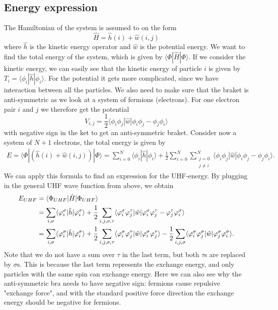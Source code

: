 \documentclass[norsk,a4paper,12pt]{article}
\begin{document}
\subsection{Energy expression}
The Hamiltonian of the system is assumed to on the form
\begin{equation}
\hat{H}=\hat{h}(i) + \hat{w}(i,j)
\end{equation}
where $\hat{h}$ is the kinetic energy operator and $\hat{w}$ is the potential energy. We want to find the total energy of the system, which is given by $\langle \Phi|\hat{H}|\Phi\rangle$. If we consider the kinetic energy, we can easily see that the kinetic energy of particle $i$ is given by $T_i=\langle\phi_i|\hat{h}|\phi_i\rangle$. For the potential it gets more complicated, since we have interaction between all the particles. We also need to make sure that the braket is anti-symmetric as we look at a system of fermions (electrons). For one electron pair $i$ and $j$ we therefore get the potential 
\begin{equation*}
V_{i,j}=\frac{1}{2}\langle\phi_i\phi_j|\hat{w}|\phi_i\phi_j-\phi_j\phi_i\rangle
\end{equation*}
with negative sign in the ket to get an anti-symmetric braket. Consider now a system of $N+1$ electrons, the total energy is given by
\begin{equation*}
\begin{split}
E=\langle\Phi|(\hat{h}(i) + \hat{w}(i,j))|\Phi\rangle
=\sum_{i=0}^N\langle\phi_i|\hat{h}|\phi_i\rangle+\frac{1}{2}\sum_{i=0}^N\sum_{\substack{j=0\\j\neq i}}^N\langle\phi_i\phi_j|\hat{w}|\phi_i\phi_j-\phi_j\phi_i\rangle.
\end{split}
\end{equation*}
We can apply this formula to find an expression for the UHF-energy. By plugging in the general UHF wave function from above, we obtain
\begin{align}
E_{UHF}&=\langle \Phi_{UHF}|\hat{H}|\Phi_{UHF}\rangle\notag\\
&=\sum_{i,\sigma}\langle\varphi_i^{\sigma}|\hat{h}|\varphi_i^{\sigma}\rangle+\frac{1}{2}\sum_{i,j,\sigma,\tau}\langle\varphi_i^{\sigma}\varphi_j^{\tau}|\hat{w}|\varphi_i^{\sigma}\varphi_j^{\tau}-\varphi_j^{\tau}\varphi_i^{\sigma}\rangle\notag\\
&=\sum_{i,\sigma}\langle\varphi_i^{\sigma}|\hat{h}|\varphi_i^{\sigma}\rangle+\frac{1}{2}\sum_{i,j,\sigma,\tau}\langle\varphi_i^{\sigma}\varphi_j^{\tau}|\hat{w}|\varphi_i^{\sigma}\varphi_j^{\tau}\rangle-\frac{1}{2}\sum_{i,j,\sigma}\langle\varphi_i^{\sigma}\varphi_j^{\sigma}|\hat{w}|\varphi_j^{\sigma}\varphi_i^{\sigma}\rangle.
\label{eq:Euhf}
\end{align}
Note that we do not have a sum over $\tau$ in the last term, but both $\tau$s are replaced by $\sigma$s. This is because the last term represents the exchange energy, and only particles with the same spin can exchange energy. Here we can also see why the anti-symmetric bra needs to have negative sign: fermions cause repulsive "exchange force", and with the standard positive force direction the exchange energy should be negative for fermions. 
\end{document}
